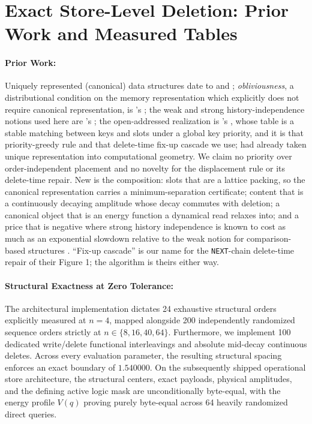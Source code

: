 \documentclass{article}
\begin{document}
\section{Exact Store-Level Deletion: Prior Work and Measured Tables}\label{app:deletion}

\paragraph{Prior Work:} Uniquely represented (canonical) data structures date to \citet{snyder_uniquely_1977} and \citet{andersson_new_1995}; \emph{obliviousness}, a distributional condition on the memory representation which explicitly does not require canonical representation, is \citeauthor{micciancio_oblivious_1997}'s \citeyearpar{micciancio_oblivious_1997}; the weak and strong history-independence notions used here are \citeauthor{naor_anti-persistence_2001}'s \citeyearpar{naor_anti-persistence_2001}; the open-addressed realization is \citeauthor{blelloch_strongly_2007}'s \citeyearpar{blelloch_strongly_2007}, whose table is a stable matching between keys and slots under a global key priority, and it is that priority-greedy rule and that delete-time fix-up cascade we use; \citet{hutchison_uniquely_2008} had already taken unique representation into computational geometry. We claim no priority over order-independent placement and no novelty for the displacement rule or its delete-time repair. New is the composition: slots that are a lattice packing, so the canonical representation carries a minimum-separation certificate; content that is a continuously decaying amplitude whose decay commutes with deletion; a canonical object that is an energy function a dynamical read relaxes into; and a price that is negative where strong history independence is known to cost as much as an exponential slowdown relative to the weak notion for comparison-based structures \citep{goos_lower_2003}. ``Fix-up cascade'' is our name for the \texttt{NEXT}-chain delete-time repair of their Figure 1; the algorithm is theirs either way.

\paragraph{Structural Exactness at Zero Tolerance:} The architectural implementation dictates 24 exhaustive structural orders explicitly measured at $n=4$, mapped alongside 200 independently randomized sequence orders strictly at $n\in\{8,16,40,64\}$. Furthermore, we implement 100 dedicated write/delete functional interleavings and absolute mid-decay continuous deletes. Across every evaluation parameter, the resulting structural spacing enforces an exact boundary of $1.540000$. On the subsequently shipped operational store architecture, the structural centers, exact payloads, physical amplitudes, and the defining active logic mask are unconditionally byte-equal, with the energy profile $V(q)$ proving purely byte-equal across 64 heavily randomized direct queries.
\end{document}

